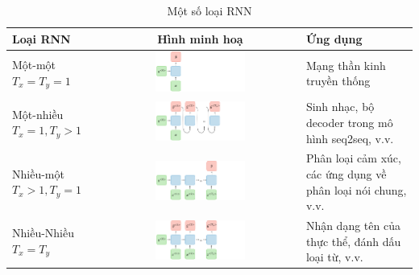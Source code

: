 \begin{table}[htb!]
    \centering
    \caption[Một số loại RNN]{Một số loại RNN \cite{webpage6}}
    \begin{threeparttable}
        \begin{tabularx}{\textwidth}{ L{0.9} c L{1} }
            \toprule
            \textbf{Loại RNN}         & \textbf{Hình minh hoạ}                                                                     & \textbf{Ứng dụng}                                                     \\\midrule
            Một-một $T_x=T_y=1$       & \includegraphics[width=0.47\textwidth, valign=t]{image/rnn-one-to-one-ltr.png}             & Mạng thần kinh truyền thống                                           \\\midrule
            Một-nhiều $T_x=1,T_y>1$   & \includegraphics[width=0.47\textwidth, valign=t]{image/rnn-one-to-many-ltr.png}            & Sinh nhạc, bộ decoder trong mô hình seq2seq, v.v.                     \\\midrule
            Nhiều-một $T_x>1,T_y=1$   & \includegraphics[width=0.47\textwidth, valign=t]{image/rnn-many-to-one-ltr.png}            & Phân loại cảm xúc, các ứng dụng về phân loại nói chung, v.v. \\\midrule
            Nhiều-Nhiều $T_x=T_y$     & \includegraphics[width=0.47\textwidth, valign=t]{image/rnn-many-to-many-same-ltr.png}      & Nhận dạng tên của thực thể, đánh dấu loại từ, v.v.  \\\midrule

\end{tabularx}
\end{threeparttable}
\end{table}
